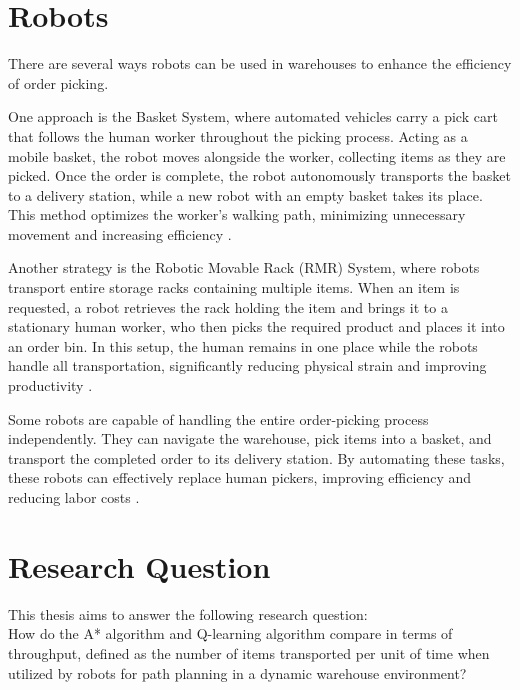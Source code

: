 \documentclass{kththesis}
\begin{document}
\section{Robots}
There are several ways robots can be used in warehouses to enhance the efficiency of order picking.

One approach is the Basket System, where automated vehicles carry a pick cart that follows the human worker throughout the picking process. Acting as a mobile basket, the robot moves alongside the worker, collecting items as they are picked. Once the order is complete, the robot autonomously transports the basket to a delivery station, while a new robot with an empty basket takes its place. This method optimizes the worker’s walking path, minimizing unnecessary movement and increasing efficiency \parencite{Koster}.

Another strategy is the Robotic Movable Rack (RMR) System, where robots transport entire storage racks containing multiple items. When an item is requested, a robot retrieves the rack holding the item and brings it to a stationary human worker, who then picks the required product and places it into an order bin. In this setup, the human remains in one place while the robots handle all transportation, significantly reducing physical strain and improving productivity \parencite{Koster}.

Some robots are capable of handling the entire order-picking process independently. They can navigate the warehouse, pick items into a basket, and transport the completed order to its delivery station. By automating these tasks, these robots can effectively replace human pickers, improving efficiency and reducing labor costs \parencite{BrightPick}.

\section{Research Question}
This thesis aims to answer the following research question:
\\
How do the A* algorithm and Q-learning algorithm compare in terms of throughput, defined as the number of items transported per unit of time when utilized by robots for path planning in a dynamic warehouse environment?
\end{document}
